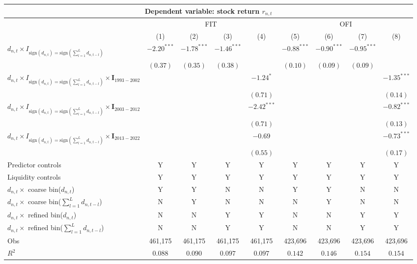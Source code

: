 \begin{tabular}{lcccccccc}
  \toprule \multicolumn{9}{c}{Dependent variable: stock return $r_{n,t}$} \\
  \midrule & \multicolumn{4}{c}{FIT} & \multicolumn{4}{c}{OFI} \\
  \cmidrule(l){2-5} \cmidrule(l){6-9} \vspace{5pt}  
  & (1) & (2) & (3) & (4) & (5) & (6) & (7) & (8) \\ 
  $d_{n,t} \times I_{\text{sign}(d_{n,t}) = \text{sign}(\sum_{l=1}^L d_{n,t-l})}$ & $-2.20^{***}$ & $-1.78^{***}$ & $-1.46^{***}$ &  & $-0.88^{***}$ & $-0.90^{***}$ & $-0.95^{***}$ &  \\ 
   & $(0.37)$ & $(0.35)$ & $(0.38)$ &  & $(0.10)$ & $(0.09)$ & $(0.09)$ &  \\ 
  $d_{n,t} \times I_{\text{sign}(d_{n,t}) = \text{sign}(\sum_{l=1}^L d_{n,t-l})}\times \mathbf{I}_{1993-2002}$ &  &  &  & $-1.24^{*}$ &  &  &  & $-1.35^{***}$ \\ 
   &  &  &  & $(0.71)$ &  &  &  & $(0.14)$ \\ 
  $d_{n,t} \times I_{\text{sign}(d_{n,t}) = \text{sign}(\sum_{l=1}^L d_{n,t-l})}\times \mathbf{I}_{2003-2012}$ &  &  &  & $-2.42^{***}$ &  &  &  & $-0.82^{***}$ \\ 
   &  &  &  & $(0.71)$ &  &  &  & $(0.13)$ \\ 
  $d_{n,t} \times I_{\text{sign}(d_{n,t}) = \text{sign}(\sum_{l=1}^L d_{n,t-l})}\times \mathbf{I}_{2013-2022}$ &  &  &  & $-0.69$ &  &  &  & $-0.73^{***}$ \\ 
   \vspace{5pt} &  &  &  & $(0.55)$ &  &  &  & $(0.17)$ \\ 
  Predictor controls & Y & Y & Y & Y & Y & Y & Y & Y \\ 
   \vspace{5pt}Liquidity controls & Y & Y & Y & Y & Y & Y & Y & Y \\ 
  $d_{n,t} \times$ coarse bin($d_{n,t}$) & Y & Y & N & N & Y & Y & N & N \\ 
   \vspace{5pt}$d_{n,t} \times$ coarse bin($\sum_{l=1}^L d_{n,t-l}$) & N & Y & N & N & N & Y & N & N \\ 
  $d_{n,t} \times$ refined bin($d_{n,t}$) & N & N & Y & Y & N & N & Y & Y \\ 
   \vspace{5pt}$d_{n,t} \times$ refined bin($\sum_{l=1}^L d_{n,t-l}$) & N & N & Y & Y & N & N & Y & Y \\ 
  Obs & 461,175 & 461,175 & 461,175 & 461,175 & 423,696 & 423,696 & 423,696 & 423,696 \\ 
  $R^2$ & $0.088$ & $0.090$ & $0.097$ & $0.097$ & $0.142$ & $0.146$ & $0.154$ & $0.154$ \\ 
   \bottomrule 
\end{tabular}
